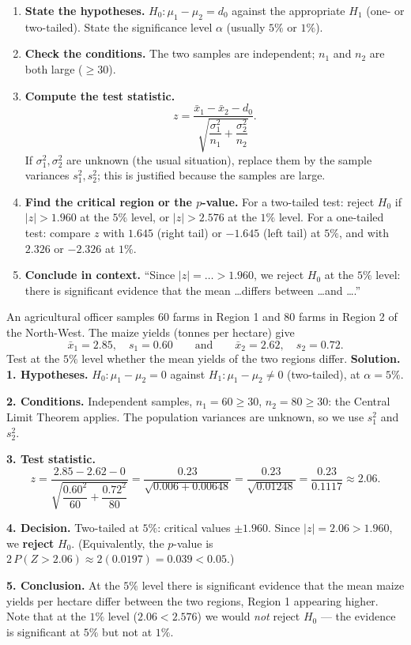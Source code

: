 \documentclass[11pt]{article}
\begin{document}
\begin{methode}
\begin{enumerate}
\item \textbf{State the hypotheses.} $H_0:\mu_1-\mu_2=d_0$ against the appropriate $H_1$ (one- or two-tailed). State the significance level $\alpha$ (usually $5\%$ or $1\%$).
\item \textbf{Check the conditions.} The two samples are independent; $n_1$ and $n_2$ are both large ($\geq 30$).
\item \textbf{Compute the test statistic.}
\[ z = \frac{\bar{x}_1-\bar{x}_2-d_0}{\sqrt{\dfrac{\sigma_1^2}{n_1}+\dfrac{\sigma_2^2}{n_2}}}. \]
If $\sigma_1^2,\sigma_2^2$ are unknown (the usual situation), replace them by the sample variances $s_1^2, s_2^2$; this is justified because the samples are large.
\item \textbf{Find the critical region or the $p$-value.} For a two-tailed test: reject $H_0$ if $|z|>1.960$ at the $5\%$ level, or $|z|>2.576$ at the $1\%$ level. For a one-tailed test: compare $z$ with $1.645$ (right tail) or $-1.645$ (left tail) at $5\%$, and with $2.326$ or $-2.326$ at $1\%$.
\item \textbf{Conclude in context.} ``Since $|z| = \ldots > 1.960$, we reject $H_0$ at the $5\%$ level: there is significant evidence that the mean \ldots differs between \ldots and \ldots.''
\end{enumerate}
\end{methode}

\begin{exoresolu}
An agricultural officer samples $60$ farms in Region 1 and $80$ farms in Region 2 of the North-West. The maize yields (tonnes per hectare) give
\[ \bar{x}_1 = 2.85,\quad s_1 = 0.60 \qquad\text{and}\qquad \bar{x}_2 = 2.62,\quad s_2 = 0.72. \]
Test at the $5\%$ level whether the mean yields of the two regions differ.
\tcblower
\textbf{Solution.}
\textbf{1. Hypotheses.} $H_0:\mu_1-\mu_2=0$ against $H_1:\mu_1-\mu_2\neq 0$ (two-tailed), at $\alpha=5\%$.

\textbf{2. Conditions.} Independent samples, $n_1=60\geq 30$, $n_2=80\geq 30$: the Central Limit Theorem applies. The population variances are unknown, so we use $s_1^2$ and $s_2^2$.

\textbf{3. Test statistic.}
\[ z=\frac{2.85-2.62-0}{\sqrt{\dfrac{0.60^2}{60}+\dfrac{0.72^2}{80}}}
=\frac{0.23}{\sqrt{0.006+0.00648}}
=\frac{0.23}{\sqrt{0.01248}}
=\frac{0.23}{0.1117}\approx 2.06. \]

\textbf{4. Decision.} Two-tailed at $5\%$: critical values $\pm 1.960$. Since $|z|=2.06>1.960$, we \textbf{reject} $H_0$. (Equivalently, the $p$-value is $2\,P(Z>2.06)\approx 2(0.0197)=0.039<0.05$.)

\textbf{5. Conclusion.} At the $5\%$ level there is significant evidence that the mean maize yields per hectare differ between the two regions, Region 1 appearing higher. Note that at the $1\%$ level ($2.06<2.576$) we would \emph{not} reject $H_0$ — the evidence is significant at $5\%$ but not at $1\%$.
\end{exoresolu}
\end{document}
